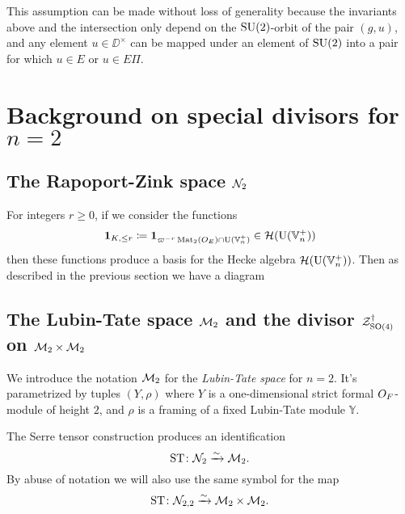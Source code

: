 This assumption can be made without loss of generality because
the invariants above and the intersection only depend
on the $\operatorname{SU}(2)$-orbit of the pair $(g,u)$,
and any element $u \in \DD^\times$ can be mapped under an element of $\operatorname{SU}(2)$
into a pair for which $u \in E$ or $u \in E \Pi$.

\section{Background on special divisors for $n = 2$}
\subsection{The Rapoport-Zink space $\mathcal N_2$}
For integers $r \ge 0$, if we consider the functions
\[ \mathbf{1}_{K, \le r} \coloneqq \mathbf{1}_{\varpi^{-r} \operatorname{Mat}_2(O_E) \cap \operatorname{U}(\mathbb V_n^+)} \in \mathcal H(\operatorname{U}(\mathbb V_n^+)) \]
then these functions produce a basis for the Hecke algebra $\mathcal H(\operatorname{U}(\mathbb V_n^+))$.
Then as described in the previous section we have a diagram
\begin{center}
\end{center}

\subsection{The Lubin-Tate space $\mathcal M_2$ and the divisor $\mathcal Z^{\dagger}_{\operatorname{SO}(4)}$ on $\mathcal M_2 \times \mathcal M_2$}
We introduce the notation $\mathcal M_2$ for the \emph{Lubin-Tate space} for $n = 2$.
It's parametrized by tuples $(Y, \rho)$
where $Y$ is a one-dimensional strict formal $O_F$-module of height $2$,
and $\rho$ is a framing of a fixed Lubin-Tate module $\mathbb{Y}$.

\begin{proposition}
  The Serre tensor construction produces an identification
  \[ \operatorname{ST} \colon \mathcal N_2 \xrightarrow{\sim} \mathcal M_2. \]
  By abuse of notation we will also use the same symbol for the map
  \[ \operatorname{ST} \colon \mathcal N_{2,2} \xrightarrow{\sim} \mathcal M_2 \times \mathcal M_2. \]
\end{proposition}

